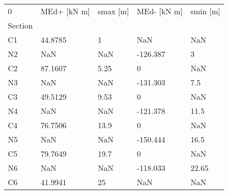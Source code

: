 \begin{tabular}{lllll}
\toprule
0 & MEd+ [kN m] & smax [m] & MEd- [kN m] & smin [m] \\
Section &             &          &             &          \\
\midrule
C1      &     44.8785 &        1 &         NaN &      NaN \\
N2      &         NaN &      NaN &    -126.387 &        3 \\
C2      &     87.1607 &     5.25 &           0 &      NaN \\
N3      &         NaN &      NaN &    -131.303 &      7.5 \\
C3      &     49.5129 &     9.53 &           0 &      NaN \\
N4      &         NaN &      NaN &    -121.378 &     11.5 \\
C4      &     76.7506 &     13.9 &           0 &      NaN \\
N5      &         NaN &      NaN &    -150.444 &     16.5 \\
C5      &     79.7649 &     19.7 &           0 &      NaN \\
N6      &         NaN &      NaN &    -118.033 &    22.65 \\
C6      &     41.9941 &       25 &         NaN &      NaN \\
\bottomrule
\end{tabular}
